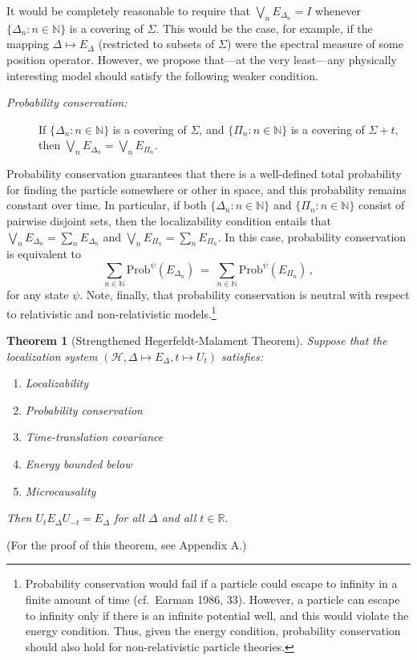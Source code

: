 \documentclass[12pt]{article}
\newtheorem{thm}{Theorem}
\theoremstyle{remark}
\newcommand{\hil}[1]{\mathcal{#1}}
\begin{document}
It would be completely reasonable to require that $\bigvee
_{n}E_{\Delta _{n}}=I$ whenever $\{ \Delta _{n}:n\in \mathbb{N}\}$ is
a covering of $\Sigma$.  This would be the case, for example, if the
mapping $\Delta \mapsto E_{\Delta}$ (restricted to subsets of
$\Sigma$) were the spectral measure of some position operator.
However, we propose that---at the very least---any physically
interesting model should satisfy the following weaker condition.
\begin{description}
\item[{\it Probability conservation:}] If $\{ \Delta _{n}:n\in
  \mathbb{N}\}$ is a covering of $\Sigma$, and $\{ \Pi _{n}:n\in
  \mathbb{N}\}$ is a covering of $\Sigma +t$, then $\bigvee
  _{n}E_{\Delta_{n}}=\bigvee _{n} E_{\Pi _{n}}$.  \end{description}
Probability conservation guarantees that there is a well-defined total
probability for finding the particle somewhere or other in space, and
this probability remains constant over time.  In particular, if both
$\{ \Delta _{n}:n\in \mathbb{N} \}$ and $\{ \Pi _{n}:n\in
\mathbb{N}\}$ consist of pairwise disjoint sets, then the
localizability condition entails that $\bigvee _{n}E_{\Delta
  _{n}}=\sum _{n}E_{\Delta _{n}}$ and $\bigvee _{n}E_{\Pi _{n}}=\sum
_{n}E_{\Pi _{n}}$.  In this case, probability conservation is
equivalent to
\begin{equation} \sum _{n\in \mathbb{N}}\mathrm{Prob} ^{\psi}(E_{\Delta
 _{n}})\:=\:\sum _{n\in \mathbb{N}}\mathrm{Prob}^{\psi}(E_{\Pi _{n}}) \,,\end{equation} 
for any state $\psi$.  Note, finally, that probability conservation is neutral with respect to 
relativistic and non-relativistic models.\footnote{Probability
  conservation would fail if a particle could escape to infinity in a 
finite amount of time (cf.~Earman
  1986, 33).  However, a particle can escape to infinity
only if there is an infinite potential well, and this would violate the energy 
condition.  Thus, given the energy condition, 
probability conservation should also hold for
non-relativistic particle theories.}   

\begin{thm}[Strengthened Hegerfeldt-Malament Theorem]  Suppose that
  the localization system $(\hil{H}, \Delta \mapsto
  E_{\Delta},t\mapsto U_{t})$ satisfies:
  \begin{enumerate}
  \item Localizability \label{ortho}
\item Probability conservation \label{conservation}
\item Time-translation covariance \label{covariance}
\item Energy bounded below \label{energy}
  \item Microcausality \label{micro}
\end{enumerate} Then $U_{t}E_{\Delta}U_{-t}=E_{\Delta}$ for all
$\Delta$ and all $t\in \mathbb{R}$.  \label{improve} \end{thm}
\noindent (For the proof of this theorem, see Appendix A.)  
\end{document}
